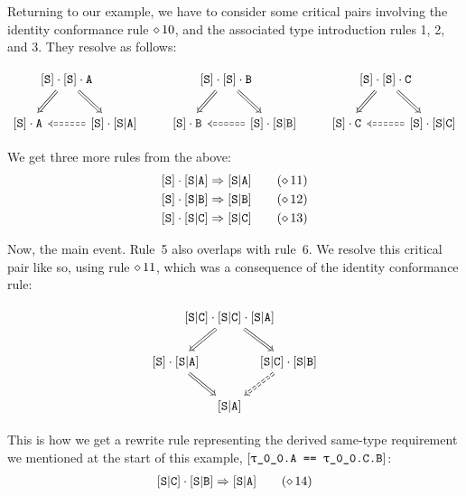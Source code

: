 \documentclass[../generics]{subfiles}
\begin{document}
\begin{example}
Returning to our example, we have to consider some critical pairs involving the identity conformance rule $\diamond\, 10$, and the associated type introduction rules 1, 2, and 3. They resolve as follows:
\begin{ceqn}
\[
\begin{tikzcd}[column sep=-1em]
& \protosym{S} \cdot \protosym{S} \cdot \nA
\arrow[ld, Rightarrow]\arrow[rd, Rightarrow] \\
\protosym{S} \cdot \nA && \protosym{S} \cdot \assocsym{S}{A} \arrow[ll, Rightarrow, dashed]
\end{tikzcd}
\qquad
\begin{tikzcd}[column sep=-1em]
& \protosym{S} \cdot \protosym{S} \cdot \nB
\arrow[ld, Rightarrow]\arrow[rd, Rightarrow] \\
\protosym{S} \cdot \nB && \protosym{S} \cdot \assocsym{S}{B} \arrow[ll, Rightarrow, dashed]
\end{tikzcd}
\qquad
\begin{tikzcd}[column sep=-1em]
& \protosym{S} \cdot \protosym{S} \cdot \nC
\arrow[ld, Rightarrow]\arrow[rd, Rightarrow] \\
\protosym{S} \cdot \nC && \protosym{S} \cdot \assocsym{S}{C} \arrow[ll, Rightarrow, dashed]
\end{tikzcd}
\]
\end{ceqn}
We get three more rules from the above:
\begin{gather*}
\protosym{S}\cdot\assocsym{S}{A}\Red\assocsym{S}{A}\tag{$\CRule{11}$}\\
\protosym{S}\cdot\assocsym{S}{B}\Red\assocsym{S}{B}\tag{$\CRule{12}$}\\
\protosym{S}\cdot\assocsym{S}{C}\Red\assocsym{S}{C}\tag{$\CRule{13}$}
\end{gather*}

Now, the main event. Rule~5 also overlaps with rule~6. We resolve this critical pair like so, using rule $\diamond\, 11$, which was a consequence of the identity conformance rule:
\begin{ceqn}
\[
\begin{tikzcd}[column sep=-2em]
& \assocsym{S}{C} \cdot \assocsym{S}{C} \cdot \assocsym{S}{A}
\arrow[ld, Rightarrow]\arrow[rd, Rightarrow] \\
\protosym{S} \cdot \assocsym{S}{A} \arrow[rd, Rightarrow] && \assocsym{S}{C} \cdot \assocsym{S}{B} \arrow[ld, Rightarrow, dashed] \\
& \assocsym{S}{A}
\end{tikzcd}
\]
\end{ceqn}
This is how we get a rewrite rule representing the derived same-type requirement we mentioned at the start of this example, $\SameReq{\rT.A}{\rT.C.B}$:
\begin{gather*}
\assocsym{S}{C} \cdot \assocsym{S}{B} \Red \assocsym{S}{A} \tag{$\CRule{14}$}
\end{gather*}


\end{example}
\end{document}
